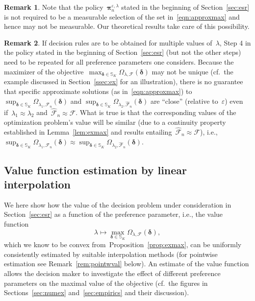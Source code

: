 \documentclass[11pt, a4paper]{article}
\theoremstyle{definition}
\newtheorem{remark}{Remark}[section]
\begin{document}
\begin{remark}
Note that the policy~$\bm{\pi}_n^{\varepsilon, \lambda}$ stated in the beginning of Section~\ref{sec:esr} is not required to be a measurable selection of the set in~\eqref{eqn:approxmax} and hence may not be measurable. Our theoretical results take care of this possibility.
\end{remark}

\begin{remark}
If decision rules are to be obtained for multiple values of~$\lambda$, Step 4 in the policy stated in the beginning of Section~\ref{sec:esr}  (but not the other steps) need to be repeated for all preference parameters one considers. Because the maximizer of the objective~$\max_{\bm{\delta} \in \mathbb{S}_K} \Omega_{\lambda, \mathcal{F}}(\bm{\delta})$ may not be unique (cf.~the example discussed in Section~\ref{ssec:ex} for an illustration), there is no guarantee that specific approximate solutions (as in~\eqref{eqn:approxmax}) to $\sup_{\bm{\delta} \in \mathbb{S}_K} \Omega_{\lambda_1, \hat{\mathcal{F}}_n}(\bm{\delta})$ and $\sup_{\bm{\delta} \in \mathbb{S}_K} \Omega_{\lambda_2, \hat{\mathcal{F}}_n}(\bm{\delta})$ are ``close'' (relative to~$\varepsilon$) even if~$\lambda_1 \approx \lambda_2$ and~$\hat{\mathcal{F}}_n \approx \mathcal{F}$. What is true is that the corresponding values of the optimization problem's value will be similar (due to a continuity property established in Lemma~\ref{lem:exmax} and results entailing~$\hat{\mathcal{F}}_n \approx \mathcal{F}$), i.e., $\sup_{\bm{\delta} \in \mathbb{S}_K} \Omega_{\lambda_1, \hat{\mathcal{F}}_n}(\bm{\delta}) \approx \sup_{\bm{\delta} \in \mathbb{S}_K} \Omega_{\lambda_2, \hat{\mathcal{F}}_n}(\bm{\delta})$.
\end{remark}

\subsection{Value function estimation by linear interpolation}\label{sec:valinterpol}

We here show how the value of the decision problem under consideration in Section~\ref{sec:esr} as a function of the preference parameter, i.e., the value function~
\begin{equation}\label{eqn:valfun1}\lambda \mapsto \max_{\bm{\delta} \in \mathbb{S}_K} \Omega_{\lambda, \mathcal{F}}(\bm{\delta}),
\end{equation}
%
which we know to be convex from~Proposition~\ref{prop:exmax}, can be uniformly consistently estimated by suitable interpolation methods (for pointwise estimation see Remark~\ref{rem:pointwval} below). An estimate of the value function allows the decision maker to investigate the effect of different preference parameters on the maximal value of the objective (cf.~the figures in 
Sections~\ref{sec:numex} and~\ref{sec:empirics} and their discussion).
\end{document}
